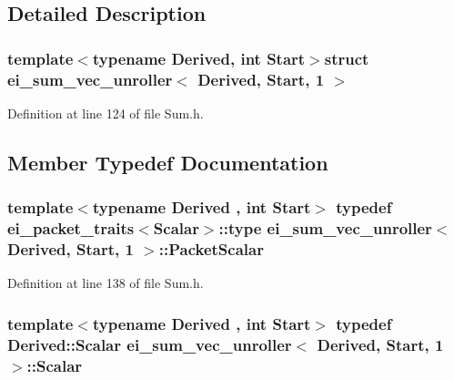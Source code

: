 \subsection{Detailed Description}
\subsubsection*{template$<$typename Derived, int Start$>$struct ei\-\_\-sum\-\_\-vec\-\_\-unroller$<$ Derived, Start, 1 $>$}



Definition at line 124 of file Sum.\-h.



\subsection{Member Typedef Documentation}
\hypertarget{structei__sum__vec__unroller_3_01_derived_00_01_start_00_011_01_4_a9deddb8a7d5fc614b13d344e135b45ce}{
\subsubsection[{Packet\-Scalar}]{\setlength{\rightskip}{0pt plus 5cm}template$<$typename Derived , int Start$>$ typedef {\bf ei\-\_\-packet\-\_\-traits}$<${\bf Scalar}$>$\-::{\bf type} {\bf ei\-\_\-sum\-\_\-vec\-\_\-unroller}$<$ Derived, Start, 1 $>$\-::{\bf Packet\-Scalar}}}\label{structei__sum__vec__unroller_3_01_derived_00_01_start_00_011_01_4_a9deddb8a7d5fc614b13d344e135b45ce}


Definition at line 138 of file Sum.\-h.

\hypertarget{structei__sum__vec__unroller_3_01_derived_00_01_start_00_011_01_4_ac17755e7093a9375178edf2785989b02}{
\subsubsection[{Scalar}]{\setlength{\rightskip}{0pt plus 5cm}template$<$typename Derived , int Start$>$ typedef Derived\-::\-Scalar {\bf ei\-\_\-sum\-\_\-vec\-\_\-unroller}$<$ Derived, Start, 1 $>$\-::{\bf Scalar}}}\label{structei__sum__vec__unroller_3_01_derived_00_01_start_00_011_01_4_ac17755e7093a9375178edf2785989b02}


